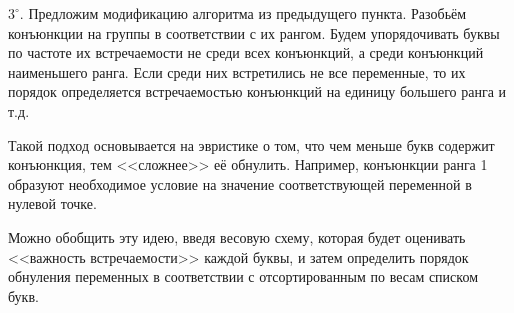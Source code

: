 \documentclass[12pt,a4paper,oneside,fleqn,leqno]{article}
\theoremstyle{definition}
\begin{document}
		$3^{\circ}.$ Предложим модификацию алгоритма из предыдущего пункта. Разобьём конъюнкции на группы в соответствии с их рангом. Будем упорядочивать буквы по частоте их встречаемости не среди всех конъюнкций, а среди конъюнкций наименьшего ранга. Если среди них встретились не все переменные, то их порядок определяется встречаемостью конъюнкций на единицу большего ранга и т.д.\par
		Такой подход основывается на эвристике о том, что чем меньше букв содержит конъюнкция, тем <<сложнее>> её обнулить. Например, конъюнкции ранга 1 образуют необходимое условие на значение соответствующей переменной в нулевой точке.\par
		Можно обобщить эту идею, введя весовую схему, которая будет оценивать <<важность встречаемости>> каждой буквы, и затем определить порядок обнуления переменных в соответствии с отсортированным по весам списком букв.\par
\end{document}
